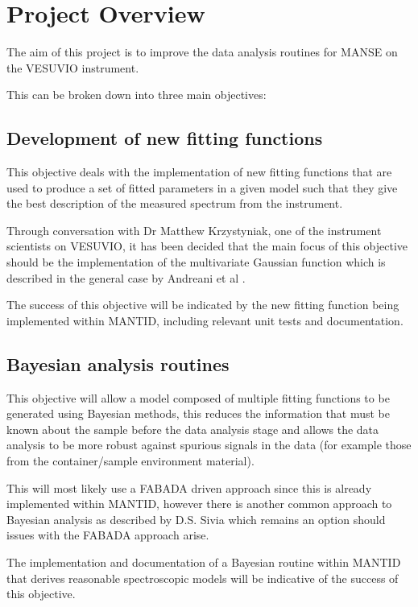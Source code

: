 \documentclass[a4paper,11pt]{article}
\begin{document}
\section{Project Overview}
\label{sec:overview}

The aim of this project is to improve the data analysis routines for
\gls*{MANSE} on the VESUVIO instrument.

This can be broken down into three main objectives:

\subsection{Development of new fitting functions}
\label{sec:objective1}

This objective deals with the implementation of new fitting functions that are
used to produce a set of fitted parameters in a given model such that they give
the best description of the measured spectrum from the instrument.

Through conversation with Dr Matthew Krzystyniak, one of the instrument
scientists on VESUVIO, it has been decided that the main focus of this objective
should be the implementation of the multivariate Gaussian function which is
described in the general case by Andreani et al \cite{Andreani2001}.

The success of this objective will be indicated by the new fitting function
being implemented within \gls*{MANTID}, including relevant unit tests and
documentation.

\subsection{Bayesian analysis routines}
\label{sec:objective2}

This objective will allow a model composed of multiple fitting functions to be
generated using Bayesian methods, this reduces the information that must be
known about the sample before the data analysis stage and allows the data
analysis to be more robust against spurious signals in the data (for example
those from the container/sample environment material).

This will most likely use a FABADA \cite{fabada} driven approach since this is
already implemented within \gls*{MANTID}, however there is another common
approach to Bayesian analysis as described by D.S. Sivia \cite{sivia_bayes}
which remains an option should issues with the FABADA approach arise.

The implementation and documentation of a Bayesian routine within \gls*{MANTID}
that derives reasonable spectroscopic models will be indicative of the success
of this objective.
\end{document}
